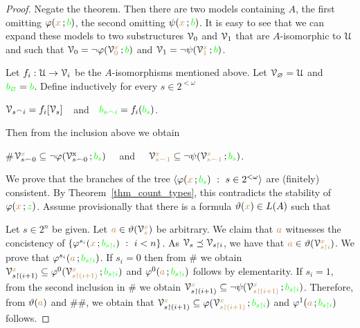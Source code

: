 \begin{proof}
  Negate the theorem. 
  Then there are two models containing $A$, the first omitting $\varphi({\color{brown} x}\,;{\color{green} b})$, the second omitting $\psi({\color{brown} x}\,;{\color{green} b})$.
  It is easy to see that we can expand these models to two substructures $\EuScript V_0$ and $\EuScript V_1$ that are $A$-isomorphic to $\EuScript U$ and such that $\EuScript V_0=\neg\varphi(\EuScript V_0^{\color{brown} x}\,;{\color{green} b})$ and $\EuScript V_1=\neg\psi(\EuScript V_1^{\color{brown} x}\,;{\color{green} b})$.

  Let $f_i:\EuScript U\to\EuScript V_i$ be the $A$-isomorphisms mentioned above. 
  Let $\EuScript V_\varnothing=\EuScript U$ and ${\color{green} b_\varnothing}={\color{green} b}$.
  Define inductively for every $s\in 2^{<\omega}$ 

  \hfil$\EuScript V_{s^\frown i}=f_i[\EuScript V_s]$\ \ and\ \ ${\color{green} b_{s\frown i}}=f_i({\color{green} b_s})$.

  Then from the inclusion above we obtain

  \#\hfil$\EuScript V_{s\frown0}^{{\color{brown} x}}\subseteq\neg\varphi(\EuScript V_{s\frown0}^{\rm x}\,;{\color{green} b_s})$ \ \ and \ \  $\EuScript V_{s\frown1}^{\color{brown} x}\subseteq\neg\psi(\EuScript V_{s\frown1}^{\color{brown} x}\,;{\color{green} b_s})$.

  We prove that the branches of the tree $\<\phi({\mr x}\,;{\gr b_s})\ :\  s\in2^{<\omega}\>$ are (finitely) consistent. 
  By Theorem~\ref{thm_count_types}, this contradicts the stability of $\varphi({\color{brown} x}\,;{\color{green} z})$.
  Assume provisionally that there is a formula $\vartheta({\color{brown} x})\in L(A)$ such that
  
  
  Let $s\in2^n$ be given.
  Let ${\color{brown} a}\in\vartheta(\EuScript V_s^{\color{brown} x})$ be arbitrary. We claim that ${\color{brown} a}$ witnesses the concistency of $\{\phi^{s_i}({\mr x}\,;{\gr b_{s\restriction i}})\ :\ i<n\}$.
  As $\EuScript V_s\preceq\EuScript V_{s\restriction i}$, we have that ${\color{brown} a}\in\vartheta(\EuScript V_{s\restriction i}^{\color{brown} x})$.
  We prove that $\varphi^{s_i}({\color{brown} a}\,;{\color{green} b_{s\restriction i}})$.
  If $s_i=0$ then from \# we obtain $\EuScript V_{s\restriction(i+1)}^{{\color{brown} x}}\subseteq\varphi^0(\EuScript V_{s\restriction(i+1)}^{\color{brown} x}\,;{\color{green} b_{s\restriction i}})$ and $\varphi^0({\color{brown} a}\,;{\color{green} b_{s\restriction i}})$ follows by elementarity.
  If $s_i=1$, from the second inclusion in \# we obtain $\EuScript V_{s\restriction(i+1)}^{{\color{brown} x}}\subseteq\neg\psi(\EuScript V_{s\restriction(i+1)}^{\color{brown} x}\,;{\color{green} b_{s\restriction i}})$.
  Therefore, from $\vartheta({\color{brown} a})$ and \#\#, we obtain that $\EuScript V_{s\restriction(i+1)}^{{\color{brown} x}}\subseteq\varphi(\EuScript V_{s\restriction(i+1)}^{\color{brown} x}\,;{\color{green} b_{s\restriction i}})$ and $\varphi^1({\color{brown} a}\,;{\color{green} b_{s\restriction i}})$ follows.


\end{proof}
